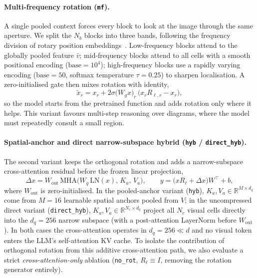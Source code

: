 \documentclass[10pt,twocolumn,letterpaper]{article}
\begin{document}
\paragraph{Multi-frequency rotation (\texttt{mf}).}
A single pooled context forces every block to look at the image through the
same aperture. We split the $N_b$ blocks into three bands, following the
frequency division of rotary position embeddings~\citep{su2024roformer}. 
Low-frequency blocks attend to the globally pooled feature $\bar v$;
mid-frequency blocks
attend to all cells with a smooth positional encoding
($\mathrm{base}{=}10^4$); high-frequency blocks use a rapidly varying encoding
($\mathrm{base}{=}50$, softmax temperature $\tau{=}0.25$) to sharpen
localisation. A zero-initialised gate then mixes rotation with identity,
\begin{equation}
\tilde x_r = x_r + 2\sigma\big(W_g x\big)_r\,\big(x_rR_{\ell,r}-x_r\big),
\label{eq:gate}
\end{equation}
so the model starts from the pretrained function and adds rotation only where
it helps. This variant favours multi-step reasoning over diagrams, where the
model must repeatedly consult a small region.

\paragraph{Spatial-anchor and direct narrow-subspace hybrid (\texttt{hyb} / \texttt{direct\_hyb}).}
The second variant keeps the orthogonal rotation and adds a narrow-subspace
cross-attention residual before the frozen linear projection,
\begin{equation}
\Delta x = W_{\mathrm{out}}\,
\mathrm{MHA}\big(W_q\,\mathrm{LN}(x),\, K_a,\, V_a\big),
\qquad
y=\big(xR_\ell+\Delta x\big)W^{\top}+b,
\label{eq:hyb}
\end{equation}
where $W_{\mathrm{out}}$ is zero-initialised. In the pooled-anchor variant
(\texttt{hyb}), $K_a,V_a\in\mathbb{R}^{M\times d_q}$ come from $M{=}16$
learnable spatial anchors pooled from $V$; in the uncompressed direct variant
(\texttt{direct\_hyb}), $K_a,V_a\in\mathbb{R}^{N_c\times d_q}$ project all $N_c$
visual cells directly into the $d_q{=}256$ narrow subspace (with a post-attention
LayerNorm before $W_{\mathrm{out}}$). In both cases the cross-attention operates
in $d_q{=}256\ll d$ and no visual token enters the LLM's self-attention KV
cache. To isolate the contribution of orthogonal rotation from this additive
cross-attention path, we also evaluate a strict \emph{cross-attention-only}
ablation (\texttt{no\_rot}, $R_\ell\equiv I$, removing the rotation generator
entirely).
\end{document}
